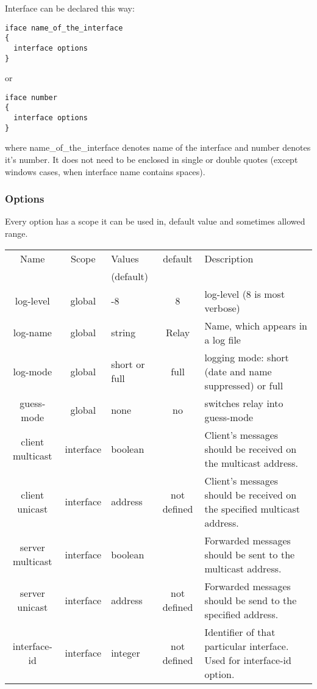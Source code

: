 Interface can be declared this way:
\begin{verbatim}
iface name_of_the_interface
{
  interface options
}
\end{verbatim}

or 

\begin{verbatim}
iface number 
{
  interface options
}
\end{verbatim}

where name\_of\_the\_interface denotes name of the interface and
number denotes it's number. It does not need to be enclosed in
single or double quotes (except windows cases, when interface name
contains spaces).

\subsubsection{Options}

Every option has a scope it can be used in, default value and
sometimes allowed range.

\begin{tabular}{|c|c|>{\centering}p{1.7cm}<{}|c|p{6cm}|}
\hline
Name             & Scope   & Values      & default    & Description \\
                 &         & (default)   &  & \\
\hline
log-level        & global  & 1-8         & 8          & log-level (8 is most verbose) \\
log-name         & global  & string      & Relay      & Name, which appears in a log file\\
log-mode         & global  &short or full& full       & logging mode: short (date and name suppressed) or full \\
guess-mode       & global  & none        & no         & switches relay into guess-mode \\

client multicast &interface& boolean     &            & Client's messages should be received on the multicast address.\\
client unicast   &interface& address     &not defined & Client's messages should be received on the specified multicast address. \\
server multicast &interface& boolean     &            & Forwarded messages should be sent to the multicast address. \\
server unicast   &interface& address     &not defined & Forwarded messages should be send to the specified address. \\
interface-id     &interface& integer     &not defined & Identifier of that particular interface. Used for interface-id option. \\
\hline
\end{tabular}

